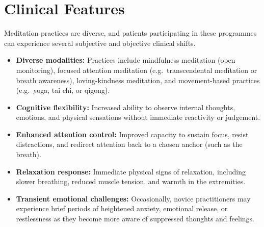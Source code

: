 \section*{Clinical Features}
Meditation practices are diverse, and patients participating in these programmes can experience several subjective and objective clinical shifts.
\begin{itemize}
    \item \textbf{Diverse modalities:} Practices include mindfulness meditation (open monitoring), focused attention meditation (e.g.\ transcendental meditation or breath awareness), loving-kindness meditation, and movement-based practices (e.g.\ yoga, tai chi, or qigong).
    \item \textbf{Cognitive flexibility:} Increased ability to observe internal thoughts, emotions, and physical sensations without immediate reactivity or judgement.
    \item \textbf{Enhanced attention control:} Improved capacity to sustain focus, resist distractions, and redirect attention back to a chosen anchor (such as the breath).
    \item \textbf{Relaxation response:} Immediate physical signs of relaxation, including slower breathing, reduced muscle tension, and warmth in the extremities.
    \item \textbf{Transient emotional challenges:} Occasionally, novice practitioners may experience brief periods of heightened anxiety, emotional release, or restlessness as they become more aware of suppressed thoughts and feelings.
\end{itemize}

